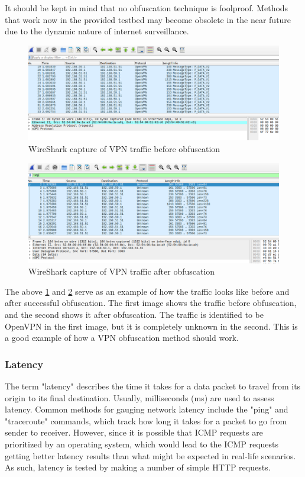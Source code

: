 \documentclass[12pt, fleqn, a4paper]{article}
\begin{document}
It should be kept in mind that no obfuscation technique is foolproof. Methods that work now in the provided testbed may become obsolete in the near future due to the dynamic nature of internet surveillance. 
\begin{figure}[H]
	\centering
	\includegraphics[width=1\textwidth]{img/before}
	\caption{WireShark capture of VPN traffic before obfuscation}
  \label{fig:before}
\end{figure}
\begin{figure}[H]
	\centering
	\includegraphics[width=1\textwidth]{img/after}
	\caption{WireShark capture of VPN traffic after obfuscation}
  \label{fig:after}
\end{figure}
The above \cref{fig:before} and \cref{fig:after} serve as an example of how the traffic looks like before and after successful obfuscation. The first image shows the traffic before obfuscation, and the second shows it after obfuscation. The traffic is identified to be OpenVPN in the first image, but it is completely unknown in the second. This is a good example of how a VPN obfuscation method should work.

\subsubsection{Latency}
The term "latency" describes the time it takes for a data packet to travel from its origin to its final destination. Usually, milliseconds (ms) are used to assess latency. Common methods for gauging network latency include the "ping" and "traceroute" commands, which track how long it takes for a packet to go from sender to receiver. However, since it is possible that ICMP requests are prioritized by an operating system, which would lead to the ICMP requests getting better latency results than what might be expected in real-life scenarios. As such, latency is tested by making a number of simple HTTP requests.
\end{document}
